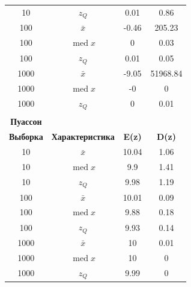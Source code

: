 \documentclass[a4paper]{article}
\begin{document}
\begin{table}[!htbp]
{\begin{tabular}{|c|c|c|c|}
                10               & $z_Q$                   & 0.01          & 0.86          \\
                100              & $\bar{x}$               & -0.46         & 205.23        \\
                100              & $\operatorname{med} x$  & 0             & 0.03          \\
                100              & $z_Q$                   & 0.01          & 0.05          \\
                1000             & $\bar{x}$               & -9.05         & 51968.84      \\
                1000             & $\operatorname{med} x$  & -0            & 0             \\
                1000             & $z_Q$                   & 0             & 0.01          \\
                \hline \\
                \multicolumn{1}{|c|}{\textbf{Пуассон}} \\
                \hline
                \textbf{Выборка} & \textbf{Характеристика} & \textbf{E(z)} & \textbf{D(z)} \\
                \hline
                10               & $\bar{x}$               & 10.04         & 1.06          \\
                10               & $\operatorname{med} x$  & 9.9           & 1.41          \\
                10               & $z_Q$                   & 9.98          & 1.19          \\
                100              & $\bar{x}$               & 10.01         & 0.09          \\
                100              & $\operatorname{med} x$  & 9.88          & 0.18          \\
                100              & $z_Q$                   & 9.93          & 0.14          \\
                1000             & $\bar{x}$               & 10            & 0.01          \\
                1000             & $\operatorname{med} x$  & 10            & 0             \\
                1000             & $z_Q$                   & 9.99          & 0             \\


\end{tabular}}
\end{table}
\end{document}
